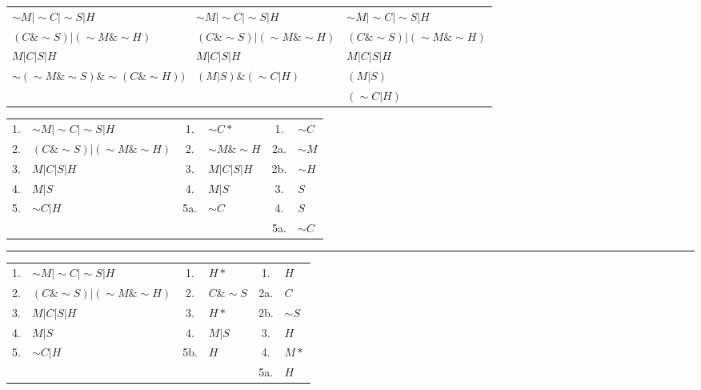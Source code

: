 \documentclass{article}
\begin{document}
\begin{enumerate}
    \vspace{10px}

    \begin{tabular}{ p{14em} p{12em} p{15em}}
        $\sim M | \sim C | \sim S|H$ & $\sim M | \sim C | \sim S|H$ & $\sim M | \sim C | \sim S|H$\\
        $(C \& \sim S) | (\sim M \& \sim H)$ & $(C \& \sim S) | (\sim M \& \sim H)$ & $(C \& \sim S) | (\sim M \& \sim H)$\\ 
        $M | C | S | H$ & $M | C | S | H$ & $M | C | S | H$\\
        $\sim (\sim M \& \sim S) \& \sim(C\& \sim H))$ & $(M | S) \& (\sim C | H)$ & $(M | S)$\\
         &  & $(\sim C | H)$\\
    \end{tabular}

    \vspace{10px}

    \begin{tabular}{ c| p{11em} c| p{6em} c| p{6em}}
        1. & $\sim M | \sim C | \sim S|H$         & 1.  & $\sim C*$           & 1.  & $\sim C$\\
        2. & $(C \& \sim S) | (\sim M \& \sim H)$ & 2.  & $\sim M \& \sim H$ & 2a. & $\sim M$\\ 
        3. & $M | C | S | H$                      & 3.  & $M | C | S | H$    & 2b. & $\sim H$\\
        4. & $M | S$                              & 4.  & $M | S$            & 3.  & $S$\\
        5. & $\sim C | H$                         & 5a. & $\sim C$           & 4.  & $S$\\
           &                                      &     &                    & 5a. & $\sim C$\\
    \end{tabular}

    \vspace{10px}
    \par\noindent\rule{\textwidth}{0.4pt}
    \vspace{3px}

    \begin{tabular}{ c| p{11em} c| p{6em} c| p{12em}}
        1. & $\sim M | \sim C | \sim S|H$         & 1.  & $H*$             & 1.  & $H$\\
        2. & $(C \& \sim S) | (\sim M \& \sim H)$ & 2.  & $C \& \sim S$   & 2a. & $C$\\ 
        3. & $M | C | S | H$                      & 3.  & $H*$            & 2b. & $\sim S$\\ 
        4. & $M | S$                              & 4.  & $M | S$         & 3.  & $H$\\
        5. & $\sim C | H$                         & 5b. & $H$             & 4.  & $M*$\\
           &                                      &     &                 & 5a. & $H$\\
    \end{tabular}


\end{enumerate}
\end{document}
